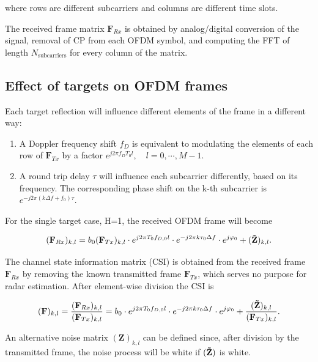     where rows are different subcarriers and columns are different time slots.
    
    The received frame matrix $\mathbf F_{Rx}$ is obtained by analog/digital conversion of the signal, removal of CP from each OFDM symbol, and computing the FFT of length $N_{\text{subcarriers}}$ for every column of the matrix.
    
    \subsection{Effect of targets on OFDM frames}
    Each target reflection will influence different elements of the frame in a different way:
    
    \begin{enumerate}
        \item A Doppler frequency shift $f_D$ is equivalent to modulating the elements of each row of $\bm{F}_{Tx}$ by a factor $e^{j2\pi f_D T_0 l},\quad  l = 0, \cdots, M-1$.
        \item A round trip delay $\tau$ will influence each subcarrier differently, based on its frequency. The corresponding phase shift on the k-th subcarrier is $e^{-j2\pi (k\Delta f + f_0)\tau}$.
    \end{enumerate}
    
    For the single target case, H=1, the received OFDM frame will become
    
    \begin{equation}
        (\mathbf F_{Rx})_{k,l} = b_0(\mathbf F_{Tx})_{k,l} \cdot e^{j2\pi T_0 f_{D,0} l}\cdot e^{-j2\pi k \tau_0 \Delta f} \cdot e^{j\varphi_0} + (\mathbf{\Tilde{Z}})_{k,l}.
    \end{equation}
    
    The channel state information matrix (CSI) is obtained from the received frame $\mathbf{F}_{Rx}$ by removing the known transmitted frame $\mathbf{F}_{Tx}$, which serves no purpose for radar estimation. After element-wise division the CSI is
    
    \begin{equation}
        (\mathbf F)_{k,l} = \frac{(\mathbf F_{Rx})_{k,l}}{(\mathbf F_{Tx})_{k,l}} = b_0 \cdot e^{j2\pi T_0 f_{D,0} l}\cdot e^{-j2\pi k \tau_0 \Delta f} \cdot e^{j\varphi_0} + \frac{(\mathbf{\Tilde{Z}})_{k,l}}{(\mathbf F_{Tx})_{k,l}}\label{eq:CSI_frame}.    
    \end{equation}
    
    An alternative noise matrix $(\mathbf{Z})_{k,l}$ can be defined since, after division by the transmitted frame, the noise process will be white if $(\mathbf{\Tilde{Z}})$ is white.
    
